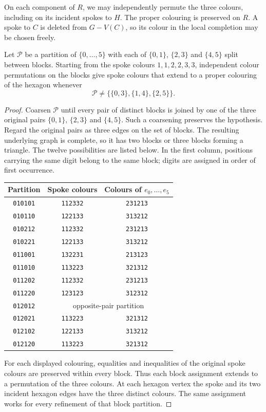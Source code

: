 \documentclass[justified,notoc,twoside,nobib,nofonts]{tufte-handout}
\newcommand{\word}[1]{\texttt{#1}}
\begin{document}
On each component of $R$, we may independently permute the three
colours, including on its incident spokes to $H$. The proper colouring
is preserved on $R$. A spoke to $C$ is deleted from $G-V(C)$, so its
colour in the local completion may be chosen freely.

\begin{lemma}\label{lem:partition}
Let $\mathcal P$ be a partition of $\{0,\dots,5\}$ with each of
$\{0,1\}$, $\{2,3\}$ and $\{4,5\}$ split between blocks. Starting
from the spoke colours $1,1,2,2,3,3$, independent colour permutations
on the blocks give spoke colours that extend to a proper colouring of the
hexagon whenever
\[
 \mathcal P\ne\bigl\{\{0,3\},\{1,4\},\{2,5\}\bigr\}.
\]
\end{lemma}

\begin{proof}
Coarsen $\mathcal P$ until every pair of distinct blocks is joined
by one of the three original pairs $\{0,1\}$, $\{2,3\}$ and
$\{4,5\}$. Such a coarsening preserves the hypothesis. Regard the
original pairs as three edges on the set of blocks. The resulting
underlying graph is complete, so it has two blocks or three blocks
forming a triangle. The twelve possibilities are listed below.
In the first column, positions carrying the same digit belong to the
same block; digits are assigned in order of first occurrence.

\begin{center}
\small
\begin{tabular}{@{}ccc@{}}
\toprule
Partition & Spoke colours & Colours of $e_0,\dots,e_5$\\
\midrule
\word{010101} & \word{112332} & \word{231213}\\
\word{010110} & \word{122133} & \word{313212}\\
\word{010212} & \word{112332} & \word{231213}\\
\word{010221} & \word{122133} & \word{313212}\\
\word{011001} & \word{132231} & \word{213123}\\
\word{011010} & \word{113223} & \word{321312}\\
\word{011202} & \word{112332} & \word{231213}\\
\word{011220} & \word{123123} & \word{312312}\\
\word{012012} & \multicolumn{2}{c}{opposite-pair partition}\\
\word{012021} & \word{113223} & \word{321312}\\
\word{012102} & \word{122133} & \word{313212}\\
\word{012120} & \word{113223} & \word{321312}\\
\bottomrule
\end{tabular}
\end{center}
For each displayed colouring, equalities and inequalities of the
original spoke colours are preserved within every block. Thus each
block assignment extends to a permutation of the three colours.
At each hexagon vertex the spoke and its two incident hexagon edges
have the three distinct colours. The same assignment works for every
refinement of that block partition.


\end{proof}
\end{document}
